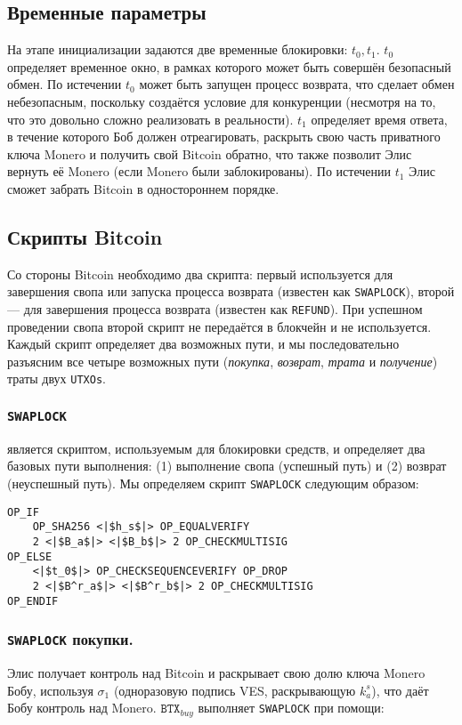 \documentclass{llncs}
\newcommand{\BTX}{\texttt{BTX}}
\begin{document}
\subsection{Временные параметры}
На этапе инициализации задаются две временные блокировки: $t_0, t_1$. $t_0$ определяет временное окно, в рамках которого может быть совершён безопасный обмен. По истечении $t_0$ может быть запущен процесс возврата, что сделает обмен небезопасным, поскольку создаётся условие для конкуренции (несмотря на то, что это довольно сложно реализовать в реальности). $t_1$ определяет время ответа, в течение которого Боб должен отреагировать, раскрыть свою часть приватного ключа Monero и получить свой Bitcoin обратно, что также позволит Элис вернуть её Monero (если Monero были заблокированы). По истечении $t_1$ Элис сможет забрать Bitcoin в одностороннем порядке.

\subsection{Скрипты Bitcoin}
Со стороны Bitcoin необходимо два скрипта: первый используется для завершения свопа или запуска процесса возврата (известен как \texttt{SWAPLOCK}), второй — для завершения процесса возврата (известен как \texttt{REFUND}). При успешном проведении свопа второй скрипт не передаётся в блокчейн и не используется. Каждый скрипт определяет два возможных пути, и мы последовательно разъясним все четыре возможных пути (\textit{покупка}, \textit{возврат}, \textit{трата} и \textit{получение}) траты двух \texttt{UTXOs}.

\subsubsection{\texttt{SWAPLOCK}}
является скриптом, используемым для блокировки средств, и определяет два базовых пути выполнения: (1) выполнение свопа (успешный путь) и (2) возврат (неуспешный путь). Мы определяем скрипт \texttt{SWAPLOCK} следующим образом:

\begin{verbatim}
OP_IF
    OP_SHA256 <|$h_s$|> OP_EQUALVERIFY
    2 <|$B_a$|> <|$B_b$|> 2 OP_CHECKMULTISIG
OP_ELSE
    <|$t_0$|> OP_CHECKSEQUENCEVERIFY OP_DROP
    2 <|$B^r_a$|> <|$B^r_b$|> 2 OP_CHECKMULTISIG
OP_ENDIF
\end{verbatim}

\subsubsection{\texttt{SWAPLOCK} покупки.}
Элис получает контроль над Bitcoin и раскрывает свою долю ключа Monero Бобу, используя $\sigma_1$ (одноразовую подпись VES, раскрывающую $k^s_a$), что даёт Бобу контроль над Monero. $\BTX_\textit{buy}$ выполняет \texttt{SWAPLOCK} при помощи:
\end{document}
